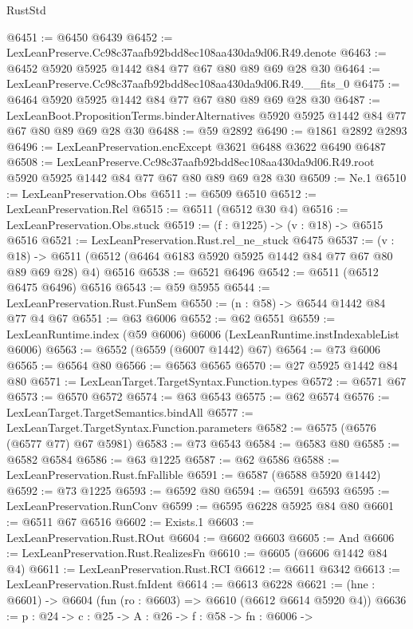 \begin{lexlean}{RustStd}
\begin{coremodule}
@6451 := @6450 @6439
@6452 := LexLeanPreserve.Cc98c37aafb92bdd8ec108aa430da9d06.R49.denote
@6463 := @6452 @5920 @5925 @1442 @84 @77 @67 @80 @89 @69 @28 @30
@6464 := LexLeanPreserve.Cc98c37aafb92bdd8ec108aa430da9d06.R49.__fits_0
@6475 := @6464 @5920 @5925 @1442 @84 @77 @67 @80 @89 @69 @28 @30
@6487 := LexLeanBoot.PropositionTerms.binderAlternatives
    @5920
    @5925
    @1442
    @84
    @77
    @67
    @80
    @89
    @69
    @28
    @30
@6488 := @59 @2892
@6490 := @1861 @2892 @2893
@6496 := LexLeanPreservation.encExcept @3621 @6488 @3622 @6490 @6487
@6508 := LexLeanPreserve.Cc98c37aafb92bdd8ec108aa430da9d06.R49.root
    @5920
    @5925
    @1442
    @84
    @77
    @67
    @80
    @89
    @69
    @28
    @30
@6509 := Ne.{1}
@6510 := LexLeanPreservation.Obs
@6511 := @6509 @6510
@6512 := LexLeanPreservation.Rel
@6515 := @6511 (@6512 @30 @4)
@6516 := LexLeanPreservation.Obs.stuck
@6519 := (f : @1225) -> (v : @18) -> @6515 @6516
@6521 := LexLeanPreservation.Rust.rel_ne_stuck @6475
@6537 := (v : @18) ->
  @6511 (@6512 (@6464 @6183 @5920 @5925 @1442 @84 @77 @67 @80 @89 @69 @28) @4) @6516
@6538 := @6521 @6496
@6542 := @6511 (@6512 @6475 @6496) @6516
@6543 := @59 @5955
@6544 := LexLeanPreservation.Rust.FunSem
@6550 := (n : @58) -> @6544 @1442 @84 @77 @4 @67
@6551 := @63 @6006
@6552 := @62 @6551
@6559 := LexLeanRuntime.index (@59 @6006) @6006 (LexLeanRuntime.instIndexableList @6006)
@6563 := @6552 (@6559 (@6007 @1442) @67)
@6564 := @73 @6006
@6565 := @6564 @80
@6566 := @6563 @6565
@6570 := @27 @5925 @1442 @84 @80
@6571 := LexLeanTarget.TargetSyntax.Function.types
@6572 := @6571 @67
@6573 := @6570 @6572
@6574 := @63 @6543
@6575 := @62 @6574
@6576 := LexLeanTarget.TargetSemantics.bindAll
@6577 := LexLeanTarget.TargetSyntax.Function.parameters
@6582 := @6575 (@6576 (@6577 @77) @67 @5981)
@6583 := @73 @6543
@6584 := @6583 @80
@6585 := @6582 @6584
@6586 := @63 @1225
@6587 := @62 @6586
@6588 := LexLeanPreservation.Rust.fnFallible
@6591 := @6587 (@6588 @5920 @1442)
@6592 := @73 @1225
@6593 := @6592 @80
@6594 := @6591 @6593
@6595 := LexLeanPreservation.RunConv
@6599 := @6595 @6228 @5925 @84 @80
@6601 := @6511 @67 @6516
@6602 := Exists.{1}
@6603 := LexLeanPreservation.Rust.ROut
@6604 := @6602 @6603
@6605 := And
@6606 := LexLeanPreservation.Rust.RealizesFn
@6610 := @6605 (@6606 @1442 @84 @4)
@6611 := LexLeanPreservation.Rust.RCI
@6612 := @6611 @6342
@6613 := LexLeanPreservation.Rust.fnIdent
@6614 := @6613 @6228
@6621 := (hne : @6601) -> @6604 (fun (ro : @6603) => @6610 (@6612 @6614 @5920 @4))
@6636 := {p : @24} ->
  {c : @25} ->
  {A : @26} ->
  {f : @58} ->
  {fn : @6006} ->

\end{coremodule}
\end{lexlean}
